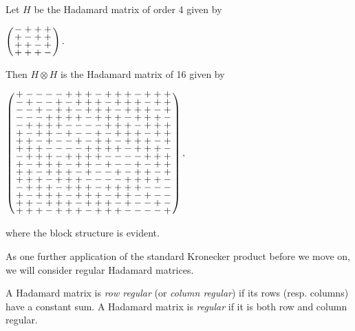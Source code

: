 \documentclass[../../../main]{subfiles}
\begin{document}
 \begin{ex}\label{regular-ex}
  Let $H$ be the Hadamard matrix of order 4 given by
  \begin{defenum}
   \item $
   \arraycolsep=1.25pt\def\arraystretch{0.625}
   \left(\begin{array}{cccc}
    -&+&+&+\\
    +&-&+&+\\
    +&+&-&+\\
    +&+&+&-
   \end{array}\right).
   $
  \end{defenum}
  Then $H \otimes H$ is the Hadamard matrix of 16 given by
  \begin{defenum}[resume]
   \item $
   \arraycolsep=1.25pt\def\arraystretch{0.625}
   \left(\begin{array}{cccccccccccccccc}
+&-&-&-&-&+&+&+&-&+&+&+&-&+&+&+\\
-&+&-&-&+&-&+&+&+&-&+&+&+&-&+&+\\
-&-&+&-&+&+&-&+&+&+&-&+&+&+&-&+\\
-&-&-&+&+&+&+&-&+&+&+&-&+&+&+&-\\
-&+&+&+&+&-&-&-&-&+&+&+&-&+&+&+\\
+&-&+&+&-&+&-&-&+&-&+&+&+&-&+&+\\
+&+&-&+&-&-&+&-&+&+&-&+&+&+&-&+\\
+&+&+&-&-&-&-&+&+&+&+&-&+&+&+&-\\
-&+&+&+&-&+&+&+&+&-&-&-&-&+&+&+\\
+&-&+&+&+&-&+&+&-&+&-&-&+&-&+&+\\
+&+&-&+&+&+&-&+&-&-&+&-&+&+&-&+\\
+&+&+&-&+&+&+&-&-&-&-&+&+&+&+&-\\
-&+&+&+&-&+&+&+&-&+&+&+&+&-&-&-\\
+&-&+&+&+&-&+&+&+&-&+&+&-&+&-&-\\
+&+&-&+&+&+&-&+&+&+&-&+&-&-&+&-\\
+&+&+&-&+&+&+&-&+&+&+&-&-&-&-&+
   \end{array}\right),
   $
  \end{defenum}
  where the block structure is evident.
 \end{ex}
 
 As one further application of the standard Kronecker product before we move on, we will consider regular Hadamard matrices.
 
 \begin{defin}
   A Hadamard matrix is {\it row regular} (or {\it column regular}) if its rows
   (resp. columns) have a constant sum. A Hadamard matrix is {\it regular} if it
   is both row and column regular. 
 \end{defin}
 
\end{document}
